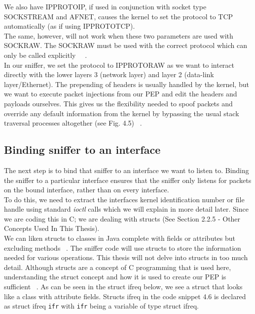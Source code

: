 We also have IPPROTO\textunderscore IP, if used in conjunction with socket type SOCK\textunderscore STREAM and AF\textunderscore NET, causes the kernel to set the protocol to TCP automatically (as if using IPPROTO\textunderscore TCP). \\

The same, however, will not work when these two parameters are used with SOCK\textunderscore RAW. The SOCK\textunderscore RAW must be used with the correct protocol which can only be called explicitly ~\cite{36}~\cite{38}.\\

In our sniffer, we set the protocol to IPPROTO\textunderscore RAW as we want to interact directly with the lower layers 3 (network layer) and layer 2 (data-link layer/Ethernet). The prepending of headers is usually handled by the kernel, but we want to execute packet injections from our PEP and edit the headers and payloads ourselves. This gives us the flexibility needed to spoof packets and override any default information from the kernel by bypassing the usual stack traversal processes altogether (see Fig. 4.5) ~\cite{38}.\\

\subsection{Binding sniffer to an interface}
The next step is to bind that sniffer to an interface we want to listen to. Binding the sniffer to a particular interface ensures that the sniffer only listens for packets on the bound interface, rather than on every interface. \\

To do this, we need to extract the interfaces kernel identification number or file handle using standard \emph{ioctl} calls which we will explain in more detail later. Since we are coding this in C; we are dealing with structs (See Section 2.2.5 - Other Concepts Used In This Thesis). \\

We can liken structs to classes in Java complete with fields or attributes but excluding methods ~\cite{39}. The sniffer code will use structs to store the information needed for various operations. This thesis will not delve into structs in too much detail. Although structs are a concept of C programming that is used here, understanding the struct concept and how it is used to create our PEP is sufficient ~\cite{39}. As can be seen in the struct ifreq below, we see a struct that looks like a class with attribute fields. Structs ifreq in the code snippet 4.6 is declared as struct ifreq {\tt ifr} with {\tt ifr} being a variable of type struct ifreq. \\

